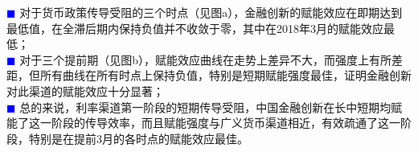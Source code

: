 \documentclass[12pt,aspectratio=169]{ctexbeamer}
\begin{document}
\begin{frame}
				\textcolor{blue}{\tiny $\blacksquare$} 对于货币政策传导受阻的三个时点（见图a），金融创新的赋能效应在即期达到最低值，在全滞后期内保持负值并不收敛于零，其中在2018年3月的赋能效应最低；\\
				\hspace{2em}
				\textcolor{blue}{\tiny $\blacksquare$} 对于三个提前期（见图b），赋能效应曲线在走势上差异不大，而强度上有所差距，但所有曲线在所有时点上保持负值，特别是短期赋能强度最佳，证明金融创新对此渠道的赋能效应十分显著；\\
				\hspace{2em}
				\textcolor{blue}{\tiny $\blacksquare$} 总的来说，利率渠道第一阶段的短期传导受阻，中国金融创新在长中短期均赋能了这一阶段的传导效率，而且赋能强度与广义货币渠道相近，有效疏通了这一阶段，特别是在提前3月的各时点的赋能效应最佳。
			\end{frame}
\end{document}
